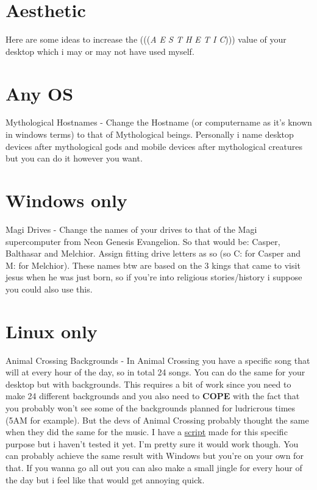\documentclass{article}
\begin{document}
\section{Aesthetic}
Here are some ideas to increase the (((\emph{A E S T H E T I C}))) value of your desktop which i may or may not have used myself.
\section{Any OS}
Mythological Hostnames - Change the Hostname (or computername as it's known in windows terms) to that of Mythological beings. Personally i name desktop devices after mythological gods and mobile devices after mythological creatures but you can do it however you want.
\section{Windows only}
Magi Drives - Change the names of your drives to that of the Magi supercomputer from Neon Genesis Evangelion. So that would be: Casper, Balthasar and Melchior. Assign fitting drive letters as so (so C: for Casper and M: for Melchior). These names btw are based on the 3 kings that came to visit jesus when he was just born, so if you're into religious stories/history i suppose you could also use this.
\section{Linux only}
Animal Crossing Backgrounds - In Animal Crossing you have a specific song that will at every hour of the day, so in total 24 songs. You can do the same for your desktop but with backgrounds. This requires a bit of work since you need to make 24 different backgrounds and you also need to \textbf{COPE} with the fact that you probably won't see some of the backgrounds planned for ludricrous times (5AM for example). But the devs of Animal Crossing probably thought the same when they did the same for the music. I have a \href{https://github.com/marcello505/configfiles/blob/master/.scripts/clockbackgrounds.sh}{script} made for this specific purpose but i haven't tested it yet. I'm pretty sure it would work though. You can probably achieve the same result with Windows but you're on your own for that. If you wanna go all out you can also make a small jingle for every hour of the day but i feel like that would get annoying quick.
\end{document}
